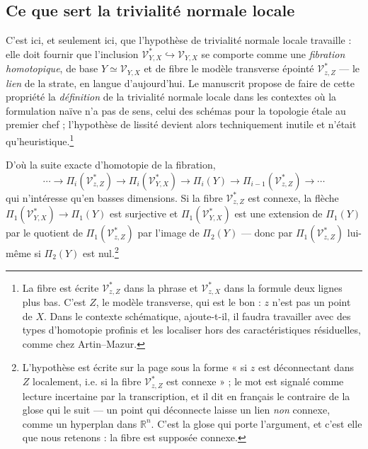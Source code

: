 \documentclass[11pt,a4paper]{article}
\begin{document}
\subsection*{Ce que sert la trivialité normale locale}

C'est ici, et seulement ici, que l'hypothèse de trivialité normale locale
travaille : elle doit fournir que l'inclusion
$\mathcal{V}^{*}_{Y,X} \hookrightarrow \mathcal{V}_{Y,X}$ se comporte comme une
\emph{fibration homotopique}, de base $Y \simeq \mathcal{V}_{Y,X}$ et de fibre
le modèle transverse épointé $\mathcal{V}^{*}_{z,Z}$ — le \emph{lien} de la
strate, en langue d'aujourd'hui. Le manuscrit propose de faire de cette
propriété la \emph{définition} de la trivialité normale locale dans les
contextes où la formulation naïve n'a pas de sens, celui des schémas pour la
topologie étale au premier chef ; l'hypothèse de lissité devient alors
techniquement inutile et n'était qu'heuristique.\footnote{La fibre est écrite
$\mathcal{V}^{*}_{z,Z}$ dans la phrase et $\mathcal{V}^{*}_{z,X}$ dans la
formule deux lignes plus bas. C'est $Z$, le modèle transverse, qui est le bon :
$z$ n'est pas un point de $X$. Dans le contexte schématique, ajoute-t-il, il
faudra travailler avec des types d'homotopie profinis et les localiser hors des
caractéristiques résiduelles, comme chez Artin--Mazur.}

D'où la suite exacte d'homotopie de la fibration,
\[
  \cdots \to \Pi_{i}(\mathcal{V}^{*}_{z,Z}) \to
  \Pi_{i}(\mathcal{V}^{*}_{Y,X}) \to \Pi_{i}(Y) \to
  \Pi_{i-1}(\mathcal{V}^{*}_{z,Z}) \to \cdots
\]
qui n'intéresse qu'en basses dimensions. Si la fibre $\mathcal{V}^{*}_{z,Z}$ est
connexe, la flèche $\Pi_{1}(\mathcal{V}^{*}_{Y,X}) \to \Pi_{1}(Y)$ est
surjective et $\Pi_{1}(\mathcal{V}^{*}_{Y,X})$ est une extension de $\Pi_{1}(Y)$
par le quotient de $\Pi_{1}(\mathcal{V}^{*}_{z,Z})$ par l'image de
$\Pi_{2}(Y)$ — donc par $\Pi_{1}(\mathcal{V}^{*}_{z,Z})$ lui-même si
$\Pi_{2}(Y)$ est nul.\footnote{L'hypothèse est écrite sur la page sous la forme
« si $z$ est déconnectant dans $Z$ localement, i.e. si la fibre
$\mathcal{V}^{*}_{z,Z}$ est connexe » ; le mot est signalé comme lecture
incertaine par la transcription, et il dit en français le contraire de la glose
qui le suit — un point qui déconnecte laisse un lien \emph{non} connexe, comme
un hyperplan dans $\mathbb{R}^{n}$. C'est la glose qui porte l'argument, et
c'est elle que nous retenons : la fibre est supposée connexe.}
\end{document}
